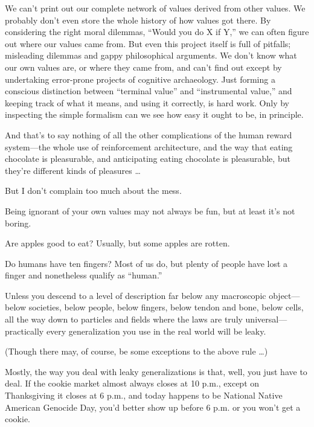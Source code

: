 {
 We can't print out our complete network of values
derived from other values. We probably don't even store
the whole history of how values got there. By considering the right
moral dilemmas, ``Would you do X if
Y,'' we can often figure out where our values came
from. But even this project itself is full of pitfalls; misleading
dilemmas and gappy philosophical arguments. We don't
know what our own values are, or where they came from, and
can't find out except by undertaking error-prone
projects of cognitive archaeology. Just forming a conscious distinction
between ``terminal value'' and
``instrumental value,'' and keeping
track of what it means, and using it correctly, is hard work. Only by
inspecting the simple formalism can we see how easy it ought to be, in
principle.}

{
 And that's to say nothing of all the other
complications of the human reward system---the whole use of
reinforcement architecture, and the way that eating chocolate is
pleasurable, and anticipating eating chocolate is pleasurable, but
they're different kinds of pleasures \ldots}

{
 But I don't complain too much about the mess.}

{
 Being ignorant of your own values may not always be fun, but at
least it's not boring.}

\myendsectiontext


{
 Are apples good to eat? Usually, but some apples are rotten. }

{
 Do humans have ten fingers? Most of us do, but plenty of people
have lost a finger and nonetheless qualify as
``human.''}

{
 Unless you descend to a level of description far below any
macroscopic object---below societies, below people, below fingers,
below tendon and bone, below cells, all the way down to particles and
fields where the laws are truly universal---practically every
generalization you use in the real world will be leaky.}

{
 (Though there may, of course, be some exceptions to the above rule
\ldots)}

{
 Mostly, the way you deal with leaky generalizations is that, well,
you just have to deal. If the cookie market almost always closes at 10
p.m., except on Thanksgiving it closes at 6 p.m., and today happens to
be National Native American Genocide Day, you'd better
show up before 6 p.m. or you won't get a cookie.}

